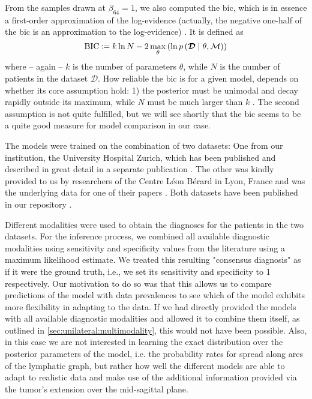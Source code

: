 \documentclass[\relativeRoot/main.tex]{subfiles}
\begin{document}
From the samples drawn at $\beta_{64} = 1$, we also computed the \gls{bic}, which is in essence a first-order approximation of the log-evidence (actually, the negative one-half of the \gls{bic} is an approximation to the log-evidence) \cite{schwarz_estimating_1978}. It is defined as
%
\begin{equation}
    \text{BIC} \coloneqq k \ln{N} - 2 \max_\theta{ \left( \ln{ p \left( \boldsymbol{\mathcal{D}} \mid \theta, \mathcal{M} \right) } \right)}
\end{equation}
%
where -- again -- $k$ is the number of parameters $\theta$, while $N$ is the number of patients in the dataset $\boldsymbol{\mathcal{D}}$. How reliable the \gls{bic} is for a given model, depends on whether its core assumption hold: 1) the posterior must be unimodal and decay rapidly outside its maximum, while $N$ must be much larger than $k$ \cite{bhat_derivation_2010}. The second assumption is not quite fulfilled, but we will see shortly that the \gls{bic} seems to be a quite good measure for model comparison in our case.

The models were trained on the combination of two datasets: One from our institution, the University Hospital Zurich, which has been published and described in great detail in a separate publication \cite{ludwig_dataset_2021}. The other was kindly provided to us by researchers of the Centre Léon Bérard in Lyon, France and was the underlying data for one of their papers \cite{bauwens_prevalence_2021}. Both datasets have been published in our repository .

Different modalities were used to obtain the diagnoses for the patients in the two datasets. For the inference process, we combined all available diagnostic modalities using sensitivity and specificity values from the literature \cite{de_bondt_detection_2007} using a maximum likelihood estimate. We treated this resulting "consensus diagnosis" as if it were the ground truth, i.e., we set its sensitivity and specificity to 1 respectively. Our motivation to do so was that this allows us to compare predictions of the model with data prevalences to see which of the model exhibits more flexibility in adapting to the data. If we had directly provided the models with all available diagnostic modalities and allowed it to combine them itself, as outlined in \cref{sec:unilateral:multimodality}, this would not have been possible. Also, in this case we are not interested in learning the exact distribution over the posterior parameters of the model, i.e. the probability rates for spread along arcs of the lymphatic graph, but rather how well the different models are able to adapt to realistic data and make use of the additional information provided via the tumor's extension over the mid-sagittal plane.
\end{document}
